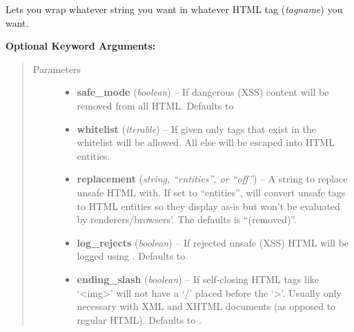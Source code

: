 \documentclass[letterpaper,10pt,english]{sphinxmanual}
\begin{document}
\begin{fulllineitems}
\label{index:htmltag.TagWrap}
Lets you wrap whatever string you want in whatever HTML tag (\emph{tagname}) you
want.

\textbf{Optional Keyword Arguments:}
\begin{quote}\begin{description}
\item[{Parameters}] \leavevmode\begin{itemize}
\item {} 
\textbf{safe\_mode} (\emph{boolean}) -- If \href{http://docs.python.org/library/constants.html\#True}{} dangerous (XSS) content will be removed
from all HTML.  Defaults to \href{http://docs.python.org/library/constants.html\#True}{}

\item {} 
\textbf{whitelist} (\emph{iterable}) -- If given only tags that exist in the whitelist will be
allowed.  All else will be escaped into HTML entities.

\item {} 
\textbf{replacement} (\emph{string, ``entities'', or ``off''}) -- A string to replace unsafe HTML with.  If set to
``entities'', will convert unsafe tags to HTML entities so they
display as-is but won't be evaluated by renderers/browsers'.  The
defaults is ``(removed)''.

\item {} 
\textbf{log\_rejects} (\emph{boolean}) -- If \href{http://docs.python.org/library/constants.html\#True}{} rejected unsafe (XSS) HTML will be
logged using .  Defaults to \href{http://docs.python.org/library/constants.html\#False}{}

\item {} 
\textbf{ending\_slash} (\emph{boolean}) -- If \href{http://docs.python.org/library/constants.html\#True}{} self-closing HTML tags like `\textless{}img\textgreater{}'
will not have a `/' placed before the `\textgreater{}'.  Usually only necessary
with XML and XHTML documents (as opposed to regular HTML).  Defaults
to \href{http://docs.python.org/library/constants.html\#False}{}.

\end{itemize}

\end{description}\end{quote}


\end{fulllineitems}
\end{document}
